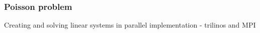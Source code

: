\documentclass{beamer}
\begin{document}
\begin{frame}[shrink=20]%
\frametitle{Poisson problem}
\scriptsize
\begin{minipage}[t][1\textheight]{1\textwidth}
\vspace{-20pt}
\begin{exampleblock}{Creating and solving linear systems in parallel implementation - trilinos and MPI}
\vspace{-20pt}
\begin{figure}
\label{fig:Poisson}
\centering
{}

\end{figure}
\end{exampleblock}
\end{minipage}
\end{frame}
\end{document}

